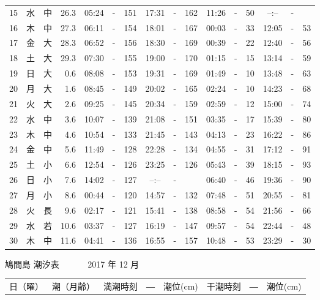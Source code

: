 \documentclass[12pt.a4j]{jsarticle}
\begin{document}
\begin{center}
\begin{table}[ht]
\begin{tabular}{|rc|cr|ccrccr|ccrccr|}
15 & 水 & 中 & 26.3 &  05:24 &-& 151  &  17:31 &-& 162  &   11:26 &-&  50  &   --:-- &-&     \\
16 & 木 & 中 & 27.3 &  06:11 &-& 154  &  18:01 &-& 167  &   00:03 &-&  33  &   12:05 &-&  53  \\
17 & 金 & 大 & 28.3 &  06:52 &-& 156  &  18:30 &-& 169  &   00:39 &-&  22  &   12:40 &-&  56  \\
18 & 土 & 大 & 29.3 &  07:30 &-& 155  &  19:00 &-& 170  &   01:15 &-&  15  &   13:14 &-&  59  \\
19 & 日 & 大 &  0.6 &  08:08 &-& 153  &  19:31 &-& 169  &   01:49 &-&  10  &   13:48 &-&  63  \\
20 & 月 & 大 &  1.6 &  08:45 &-& 149  &  20:02 &-& 165  &   02:24 &-&  10  &   14:23 &-&  68  \\
21 & 火 & 大 &  2.6 &  09:25 &-& 145  &  20:34 &-& 159  &   02:59 &-&  12  &   15:00 &-&  74  \\
22 & 水 & 中 &  3.6 &  10:07 &-& 139  &  21:08 &-& 151  &   03:35 &-&  17  &   15:39 &-&  80  \\
23 & 木 & 中 &  4.6 &  10:54 &-& 133  &  21:45 &-& 143  &   04:13 &-&  23  &   16:22 &-&  86  \\
24 & 金 & 中 &  5.6 &  11:49 &-& 128  &  22:28 &-& 134  &   04:55 &-&  31  &   17:12 &-&  91  \\
25 & 土 & 小 &  6.6 &  12:54 &-& 126  &  23:25 &-& 126  &   05:43 &-&  39  &   18:15 &-&  93  \\
26 & 日 & 小 &  7.6 &  14:02 &-& 127  &  --:-- &-&     &   06:40 &-&  46  &   19:36 &-&  90  \\
27 & 月 & 小 &  8.6 &  00:44 &-& 120  &  14:57 &-& 132  &   07:48 &-&  51  &   20:55 &-&  81  \\
28 & 火 & 長 &  9.6 &  02:17 &-& 121  &  15:41 &-& 138  &   08:58 &-&  54  &   21:56 &-&  66  \\
29 & 水 & 若 & 10.6 &  03:37 &-& 127  &  16:19 &-& 147  &   09:57 &-&  54  &   22:44 &-&  48  \\
30 & 木 & 中 & 11.6 &  04:41 &-& 136  &  16:55 &-& 157  &   10:48 &-&  53  &   23:29 &-&  30  \\
   \hline
   \end{tabular}
\end{table}
\newpage
 {\LARGE 鳩間島  潮汐表　　　}
 {\large 2017 年 12 月}\\
 \begin{table}[ht]
    \begin{tabular}{|rc|cr|ccrccr|ccrccr|}
    \hline
    \multicolumn{2}{|c|}{日（曜）} & \multicolumn{2}{c|}{潮（月齢）} & \multicolumn{6}{c|}{満潮時刻　―　潮位(cm)} & \multicolumn{6}{c|}{干潮時刻　―　潮位(cm)} \\

\end{tabular}
\end{table}
\end{center}
\end{document}
